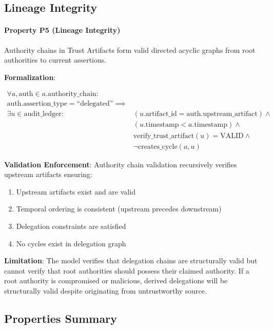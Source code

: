 \documentclass[11pt,letterpaper]{article}
\begin{document}
\subsection{Lineage Integrity}

\paragraph{Property P5 (Lineage Integrity)} Authority chains in Trust Artifacts form valid directed acyclic graphs from root authorities to current assertions.

\textbf{Formalization}:

\begin{equation}
\begin{split}
\forall a, \text{auth} \in a.\text{authority\_chain}: & \\
\text{auth}.\text{assertion\_type} = \text{``delegated''} \implies & \\
\exists u \in \text{audit\_ledger}: & (u.\text{artifact\_id} = \text{auth}.\text{upstream\_artifact}) \land \\
& (u.\text{timestamp} < a.\text{timestamp}) \land \\
& \text{verify\_trust\_artifact}(u) = \text{VALID} \land \\
& \neg \text{creates\_cycle}(a, u)
\end{split}
\end{equation}

\textbf{Validation Enforcement}: Authority chain validation recursively verifies upstream artifacts ensuring:
\begin{enumerate}
\item Upstream artifacts exist and are valid
\item Temporal ordering is consistent (upstream precedes downstream)
\item Delegation constraints are satisfied
\item No cycles exist in delegation graph
\end{enumerate}

\textbf{Limitation}: The model verifies that delegation chains are structurally valid but cannot verify that root authorities should possess their claimed authority. If a root authority is compromised or malicious, derived delegations will be structurally valid despite originating from untrustworthy source.

\subsection{Properties Summary}
\end{document}
